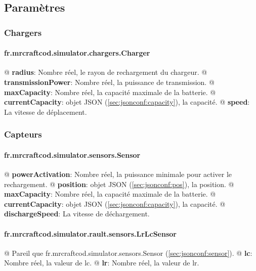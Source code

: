 \documentclass[final]{polytech/polytech}
\begin{document}
		\subsection{Paramètres\label{sec:jsonconf:params}}
			\subsubsection{Chargers}
				\paragraph{fr.mrcraftcod.simulator.chargers.Charger}
					\begin{easylist}[itemize]
						@ \textbf{radius}: Nombre réel, le rayon de rechargement du chargeur.
						@ \textbf{transmissionPower}: Nombre réel, la puissance de transmission.
						@ \textbf{maxCapacity}: Nombre réel, la capacité maximale de la batterie.
						@ \textbf{currentCapacity}: objet JSON (\autoref{sec:jsonconf:capacity}), la capacité.
						@ \textbf{speed}: La vitesse de déplacement.
					\end{easylist}
			
			\subsubsection{Capteurs}
				\paragraph{fr.mrcraftcod.simulator.sensors.Sensor\label{sec:jsonconf:sensor}}
					\begin{easylist}[itemize]
						@ \textbf{powerActivation}: Nombre réel, la puissance minimale pour activer le rechargement.
						@ \textbf{position}: objet JSON (\autoref{sec:jsonconf:pos}), la position.
						@ \textbf{maxCapacity}: Nombre réel, la capacité maximale de la batterie.
						@ \textbf{currentCapacity}: objet JSON (\autoref{sec:jsonconf:capacity}), la capacité.
						@ \textbf{dischargeSpeed}: La vitesse de déchargement.
					\end{easylist}
					
				\paragraph{fr.mrcraftcod.simulator.rault.sensors.LrLcSensor}
					\begin{easylist}[itemize]
						@ Pareil que fr.mrcraftcod.simulator.sensors.Sensor (\autoref{sec:jsonconf:sensor}).
						@ \textbf{lc}: Nombre réel, la valeur de lc.
						@ \textbf{lr}: Nombre réel, la valeur de lr.
					\end{easylist}
					
\end{document}
